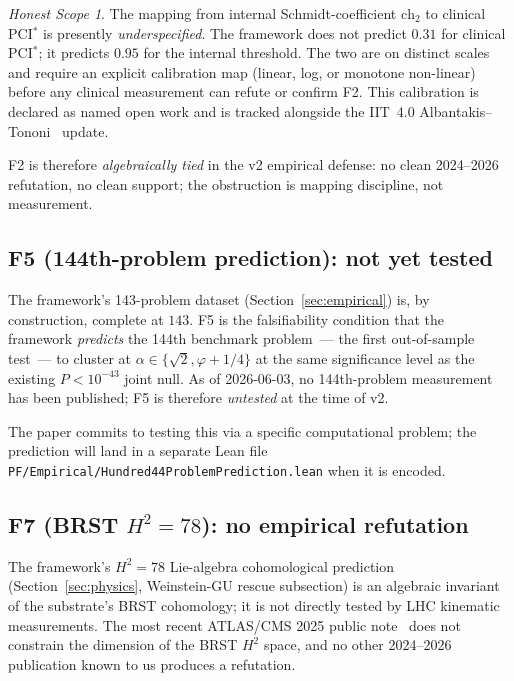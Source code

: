\documentclass[11pt,a4paper]{article}
\theoremstyle{definition}
\theoremstyle{remark}
\newtheorem{honestscope}[theorem]{Honest Scope}
\newcommand{\chtwo}{\mathrm{ch}_{2}}
\newcommand{\lean}[1]{\texttt{\small #1}}
\begin{document}
\begin{honestscope}
The mapping from internal Schmidt-coefficient $\chtwo$ to
clinical PCI$^{*}$ is presently \emph{underspecified}. The
framework does not predict $0.31$ for clinical PCI$^{*}$; it
predicts $0.95$ for the internal threshold. The two are on
distinct scales and require an explicit calibration map
(linear, log, or monotone non-linear) before any clinical
measurement can refute or confirm F2. This calibration is
declared as named open work and is tracked alongside the
IIT~4.0 Albantakis--Tononi~\cite{iit40} update.
\end{honestscope}

\noindent F2 is therefore \emph{algebraically tied} in the v2
empirical defense: no clean 2024--2026 refutation, no clean
support; the obstruction is mapping discipline, not measurement.

\subsection{F5 (144th-problem prediction): not yet tested}
\label{sec:f5-pending}

The framework's 143-problem dataset
(Section~\ref{sec:empirical}) is, by construction, complete at
$143$. F5 is the falsifiability condition that the framework
\emph{predicts} the 144th benchmark problem~--- the first
out-of-sample test~--- to cluster at $\alpha \in \{\sqrt{2},
\varphi + 1/4\}$ at the same significance level as the existing
$P < 10^{-43}$ joint null. As of 2026-06-03, no 144th-problem
measurement has been published; F5 is therefore \emph{untested}
at the time of v2.

The paper commits to testing this via a specific computational
problem; the prediction will land in a separate Lean file
\lean{PF/Empirical/Hundred44ProblemPrediction.lean} when it is
encoded.

\subsection{F7 (BRST $H^{2} = 78$): no empirical refutation}
\label{sec:f7-pending}

The framework's $H^{2} = 78$ Lie-algebra cohomological
prediction (Section~\ref{sec:physics}, Weinstein-GU rescue
subsection) is an algebraic invariant of the substrate's
BRST cohomology; it is not directly tested by LHC kinematic
measurements. The most recent ATLAS/CMS 2025 public
note~\cite{atlasphyspub2025} does not constrain the dimension
of the BRST $H^{2}$ space, and no other 2024--2026 publication
known to us produces a refutation.
\end{document}
